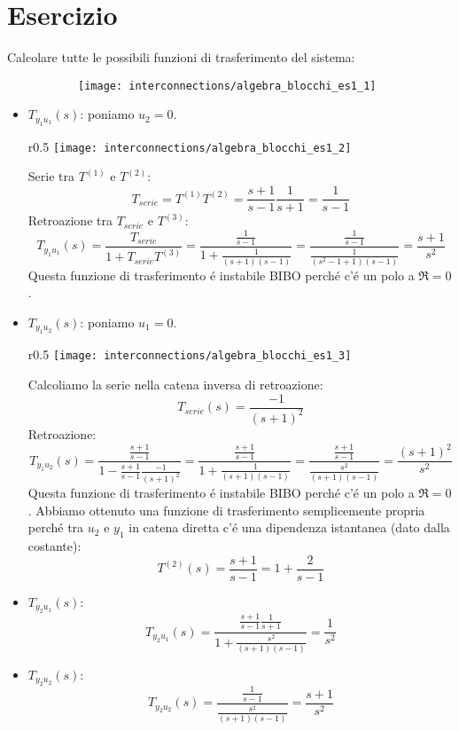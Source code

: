 \documentclass[../main.tex]{subfiles}
\begin{document}
	\section{Esercizio}
	Calcolare tutte le possibili funzioni di trasferimento del sistema:
	\begin{figure}[H]
		\centering
		\begin{subfigure}{0.8\textwidth}
			\texttt{[image: interconnections/algebra\_blocchi\_es1\_1]}
		\end{subfigure}%
	\end{figure}
	\begin{itemize}
		\item $ T_{y_1 u_1}(s) $: poniamo $ u_2 = 0 $.\\
		\parbox[t]{\dimexpr\textwidth-\leftmargin}{%
			\vspace{-2.5mm}
			\begin{wrapfigure}{r}{0.5\textwidth}
				\centering
				\vspace{-\baselineskip}
				\texttt{[image: interconnections/algebra\_blocchi\_es1\_2]}
			\end{wrapfigure}
			Serie tra $ T^{(1)} $ e $ T^{(2)} $:
			\[ T_{serie} = T^{(1)} T^{(2)} = \frac{s+1}{s-1} \frac{1}{s+1} = \frac{1}{s-1} \]
			Retroazione tra $ T_{serie} $ e $ T^{(3)} $:
			\[ T_{y_1 u_1}(s) = \frac{T_{serie}}{1+T_{serie} T^{(3)}} = \frac{\frac{1}{s-1}}{1+\frac{1}{(s+1)(s-1)}} = \frac{\frac{1}{s-1}}{\frac{1}{(s^2-1+1)(s-1)}} = \frac{s+1}{s^2} \]
			Questa funzione di trasferimento \'e instabile BIBO perch\'e c'\'e un polo a $ \Re = 0 $.
		}
		\item $ T_{y_1 u_2}(s) $: poniamo $ u_1 = 0 $.\\
		\parbox[t]{\dimexpr\textwidth-\leftmargin}{%
			\vspace{-2.5mm}
			\begin{wrapfigure}[10]{r}{0.5\textwidth}
				\centering
				\vspace{-\baselineskip}
				\texttt{[image: interconnections/algebra\_blocchi\_es1\_3]}
			\end{wrapfigure}
			Calcoliamo la serie nella catena inversa di retroazione:
			\[ T_{serie}(s) = \frac{-1}{(s+1)^2} \]
			Retroazione:
			\[ T_{y_1 u_2}(s) = \frac{\frac{s+1}{s-1}}{1-\frac{s+1}{s-1}\frac{-1}{(s+1)^2}} = \frac{\frac{s+1}{s-1}}{1+\frac{1}{(s+1)(s-1)}} = \frac{\frac{s+1}{s-1}}{\frac{s^2}{(s+1)(s-1)}} = \frac{(s+1)^2}{s^2} \]
			Questa funzione di trasferimento \'e instabile BIBO perch\'e c'\'e un polo a $ \Re = 0 $.
			Abbiamo ottenuto una funzione di trasferimento semplicemente propria perch\'e tra $ u_2 $ e $ y_1 $ in catena diretta c'\'e una dipendenza istantanea (dato dalla costante):
			\[ T^{(2)}(s) = \frac{s+1}{s-1} = 1 + \frac{2}{s-1} \]
		}
		\item $ T_{y_2 u_1}(s) $:
		\[ T_{y_2 u_1}(s) = \frac{\frac{s+1}{s-1}\frac{1}{s+1}}{1+\frac{s^2}{(s+1)(s-1)}} = \frac{1}{s^2} \]
		\item $ T_{y_2 u_2}(s) $:
		\[ T_{y_2 u_2}(s) = \frac{\frac{1}{s-1}}{\frac{s^2}{(s+1)(s-1)}} = \frac{s+1}{s^2}\]
	\end{itemize}
\end{document}
